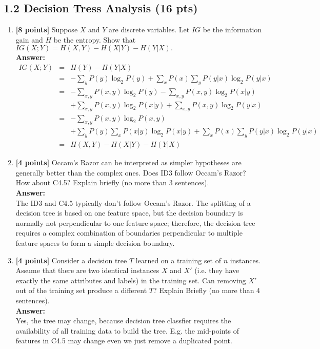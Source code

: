 \subsection*{1.2 Decision Tress Analysis (16 pts)}

\begin{enumerate}

\item\textbf{[8 points]} Suppose $X$ and $Y$ are discrete variables. Let $IG$ be the information gain and $H$ be the entropy. Show that $IG(X;Y) = H(X,Y) - H(X|Y) - H(Y|X).$
\\\textbf{Answer:}\\
\begin{equation}
\nonumber
\begin{array}{rcl}
IG(X;Y) & = & H(Y) - H(Y|X) \\
		& = & -\sum_y P(y)\log_2P(y) + \sum_x P(x) \sum_y P(y|x)\log_2P(y|x) \\
		& = & -\sum_{x,y} P(x,y)\log_2P(y) -\sum_{x,y} P(x,y)\log_2P(x|y) \\
		&   & +\sum_{x,y} P(x,y)\log_2P(x|y) +\sum_{x,y} P(x,y)\log_2P(y|x) \\
		& = & -\sum_{x,y} P(x,y)\log_2P(x,y) \\
		&   & + \sum_y P(y) \sum_x P(x|y)\log_2P(x|y) + \sum_x P(x) \sum_y P(y|x)\log_2P(y|x) \\
		& = & H(X,Y) - H(X|Y) - H(Y|X)
\end{array}
\end{equation}

\item\textbf{[4 points]} Occam's Razor can be interpreted as simpler hypotheses are generally better than the complex ones. Does ID3 follow Occam's Razor? How about C4.5? Explain briefly (no more than 3 sentences).
\\\textbf{Answer:}\\
The ID3 and C4.5 typically don't follow Occam's Razor. The splitting of a decision tree is based on one feature space, but the decision boundary is normally not perpendicular to one feature space; therefore, the decision tree requires a complex combination of boundaries perpendicular to multiple feature spaces to form a simple decision boundary.

\item\textbf{[4 points]} Consider a decision tree $T$ learned on a training set of $n$ instances. Assume that there are two identical instances $X$ and $X\prime$ (i.e. they have exactly the same attributes and labels) in the training set. Can removing $X\prime$ out of the training set produce a different $T$? Explain Briefly (no more than 4 sentences).
\\\textbf{Answer:}\\
Yes, the tree may change, because decision tree classfier requires the availability of all training data to build the tree. E.g. the mid-points of features in C4.5 may change even we just remove a duplicated point.

\end{enumerate}


\newpage
